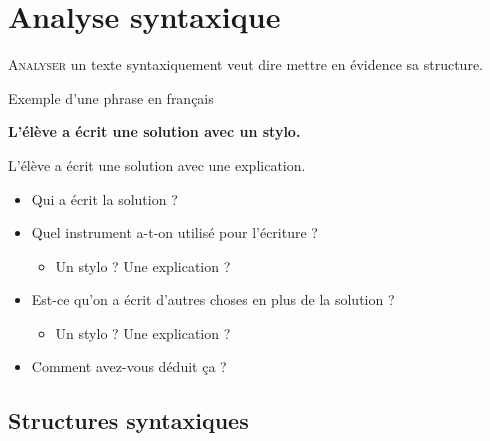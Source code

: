 \documentclass{KodeBook}
\begin{document}
		\mainmatter
	
\fi
\chapter{Analyse syntaxique}

\begin{introduction}
	\lettrine{A}{nalyser} un texte syntaxiquement veut dire mettre en évidence sa structure.
\end{introduction} 

\begin{exampleblock}{Exemple d'une phrase en français}
	\begin{center}
		\Large\bfseries
		L'élève a écrit une solution avec un stylo. 
		
		L'élève a écrit une solution avec une explication.
	\end{center}
\end{exampleblock}

\begin{itemize}
	\item Qui a écrit la solution ?
	\item Quel instrument a-t-on utilisé pour l'écriture ?
	\begin{itemize}
		\item Un stylo ? Une explication ?
	\end{itemize}
	\item Est-ce qu'on a écrit d'autres choses en plus de la solution ?
	\begin{itemize}
		\item Un stylo ? Une explication ?
	\end{itemize}
	\item Comment avez-vous déduit ça ?
\end{itemize}

\section{Structures syntaxiques}
\end{document}

